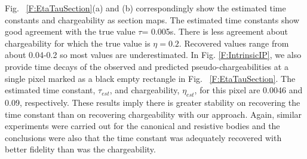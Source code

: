 \documentclass[extra,mreferee]{gji}
\newcommand{\siginf}{\sigma_\infty}
\begin{document}
Fig. ~\ref{F:EtaTauSection}(a) and (b) correspondingly show the estimated time constants and chargeability as section maps.
The estimated time constants show good agreement with the true value $\tau$= 0.005s.
There is less agreement about chargeability for which the true value is $\eta=0.2$. Recovered values range from about 0.04-0.2 so most values are underestimated.
In Fig. \ref{F:IntrinsicIP}, we also provide time decays of the observed and predicted pseudo-chargeabilities at a single pixel marked as a black empty rectangle in Fig. ~\ref{F:EtaTauSection}. The estimated time constant,  $\tau_{est}$, and chargeability, $\eta_{est}$, for this pixel are 0.0046 and 0.09, respectively.
These results imply there is greater  stability on recovering the time constant than on recovering chargeability with our approach. Again, similar experiments were carried out for the canonical and resistive bodies and the conclusions were also that the time constant was adequately recovered with better fidelity than was the chargeability.

\end{document}
